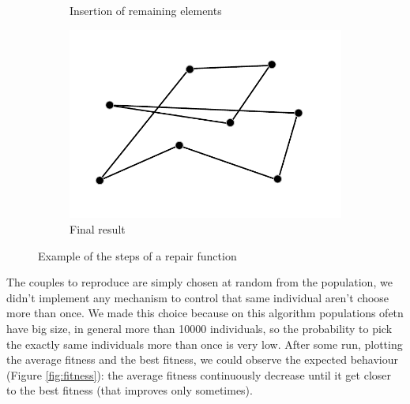 \begin{figure}[h!]
\begin{subfigure}[b]{0.49\linewidth}
    \caption{Insertion of remaining elements}
  \end{subfigure}
  \begin{subfigure}[b]{0.49\linewidth}
    \includegraphics[width=\linewidth]{media/gene4.pdf}
    \caption{Final result}
  \end{subfigure}
  \caption{Example of the steps of a repair function}
  \label{fig:genetic}
\end{figure}

\noindent The couples to reproduce are simply chosen at random from the population, we didn't implement any mechanism to control that same individual aren't choose more than once. We made this choice because on this algorithm populations ofetn have big size, in general more than 10000 individuals, so the probability to pick the exactly same individuals more than once is very low.
After some run, plotting the average fitness and the best fitness, we could observe the 
expected behaviour (Figure \ref{fig:fitness}): the average fitness continuously decrease until it get closer to the best fitness (that improves only sometimes).  \\

